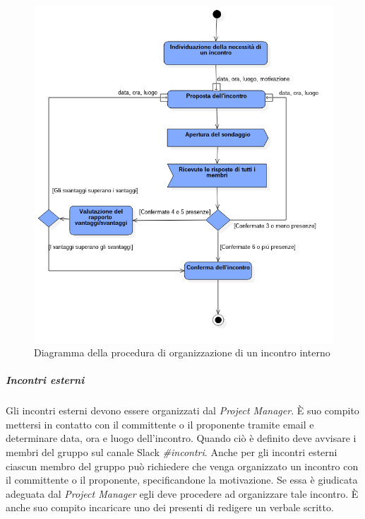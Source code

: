 \begin{figure}
	\centering
	\includegraphics[width=1\textwidth]{Images/umlincontri.png}
	\caption{Diagramma della procedura di organizzazione di un incontro interno}
\end{figure}

\subparagraph{Incontri esterni} \Spazio
Gli incontri esterni devono essere organizzati dal \emph{Project Manager}. È suo compito mettersi in contatto con il committente o il proponente tramite email e determinare data, ora e luogo dell'incontro. Quando ciò è definito deve avvisare i membri del gruppo sul canale Slack \emph{\#incontri}. Anche per gli incontri esterni ciascun membro del gruppo può richiedere che venga organizzato un incontro con il committente o il proponente, specificandone la motivazione. Se essa è giudicata adeguata dal \emph{Project Manager} egli deve procedere ad organizzare tale incontro. È anche suo compito incaricare uno dei presenti di redigere un verbale scritto.
